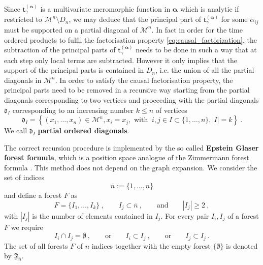 \documentclass[12pt]{book}
\newcommand{\abs}[1]{\left|#1\right|}
\newcommand{\Mcal}{\mathcal{M}}
\newcommand{\drak}{\mathfrak{d}}
\newcommand{\tsf}{\mathsf{t}}
\theoremstyle{break}
\begin{document}
Since $\tsf^{(\boldsymbol{\alpha})}_\gamma$ is a multivariate meromorphic function in $\boldsymbol{\alpha}$  which is analytic if restricted to $\Mcal^n\setminus D_n$, we may deduce that the principal part of $\tsf^{(\boldsymbol{\alpha})}_\gamma$ for some $\alpha_{ij}$ must be supported on a partial diagonal of $\Mcal^n$. In fact in order for the time ordered products to fulfil the factorisation property \eqref{eq:causal_factorization}, the subtraction of the principal parts of $\tsf^{(\boldsymbol{\alpha})}_\gamma$ needs to be done in such a way that at each step only local terms are subtracted. However it only implies that the support of the principal parts is contained in $D_n$, i.e. the union of all the partial diagonals in $\Mcal^n$. In order to satisfy the causal factorisation property, the principal parts need to be removed in a recursive way starting from the partial diagonals corresponding to two vertices and proceeding with the partial diagonals $\drak_{I}$ corresponding to an increasing number $k \leq n$ of vertices 
%
\begin{equation*}
\drak_{I} = \left\{ (x_1,\dots, x_n) \in \Mcal^n, x_i=x_j, \mbox{ with } \ i,j \in I\subset \{1,\dots, n\} , \abs{I} = k \right\} \ . 
\end{equation*}
%
We call $\drak_{I}$ \textbf{partial ordered diagonals}.

The correct recursion procedure is implemented by the so called \textbf{Epstein Glaser forest formula}, which is a position space analogue of the Zimmermann forest formula \cite{duetsch_dimensional_2014}. This method does not depend on the graph expansion. We consider the set of indices 
\begin{equation*}
\overline{n} := \{1,\dots , n\} 
\end{equation*}
and define a forest $F$ as 
%
\begin{equation*}
F = \{ I_1,\dots, I_k\} \ , \qquad I_j \subset \overline{n} \ , \qquad \mbox{and} \qquad \abs{I_j} \geq 2 \ ,
\end{equation*}
%
with $\abs{I_j}$ is the number of elements contained in $I_j$. For every pair $I_i,I_j$ of a forest $F$ we require
%
\begin{equation*}
I_i\cap I_j = \emptyset \ , \qquad \text{or} \qquad I_i \subset I_j \ , \qquad \mbox{or} \qquad  I_j\subset I_j \ .
\end{equation*}
%
The set of all forests $F$ of $n$ indices together with the empty forest $\{\emptyset\}$ is denoted by $\mathfrak{F}_{\overline{n}}$.
\end{document}
